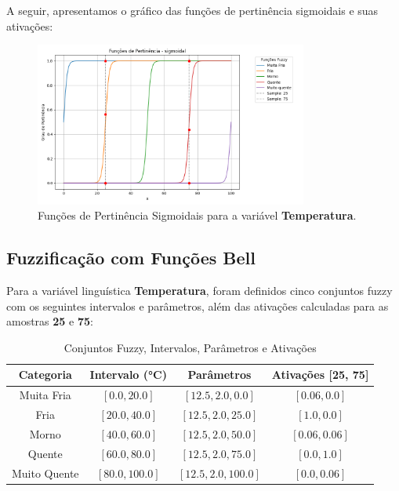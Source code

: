 \documentclass[a4paper,12pt]{article}
\begin{document}
A seguir, apresentamos o gráfico das funções de pertinência sigmoidais e suas ativações:

\begin{figure}[H]
    \centering
    \includegraphics[width=0.8\textwidth]{img/funções_de_pertinência_sigmoidal_fuzzificado.png}
    \caption{Funções de Pertinência Sigmoidais para a variável \textbf{Temperatura}.}
\end{figure}

\subsection{Fuzzificação com Funções Bell}

Para a variável linguística \textbf{Temperatura}, foram definidos cinco conjuntos fuzzy com os seguintes intervalos e parâmetros, além das ativações calculadas para as amostras \textbf{25} e \textbf{75}:

\begin{table}[H]
\centering
\caption{Conjuntos Fuzzy, Intervalos, Parâmetros e Ativações}
\begin{tabular}{|c|c|c|c|}
\hline
\textbf{Categoria}    & \textbf{Intervalo (°C)} & \textbf{Parâmetros}       & \textbf{Ativações [25, 75]} \\ \hline
Muita Fria            & $[0.0, 20.0]$          & $[12.5, 2.0, 0.0]$        & $[0.06, 0.0]$              \\ \hline
Fria                  & $[20.0, 40.0]$         & $[12.5, 2.0, 25.0]$       & $[1.0, 0.0]$               \\ \hline
Morno                 & $[40.0, 60.0]$         & $[12.5, 2.0, 50.0]$       & $[0.06, 0.06]$             \\ \hline
Quente                & $[60.0, 80.0]$         & $[12.5, 2.0, 75.0]$       & $[0.0, 1.0]$               \\ \hline
Muito Quente          & $[80.0, 100.0]$        & $[12.5, 2.0, 100.0]$      & $[0.0, 0.06]$              \\ \hline
\end{tabular}
\end{table}
\end{document}
